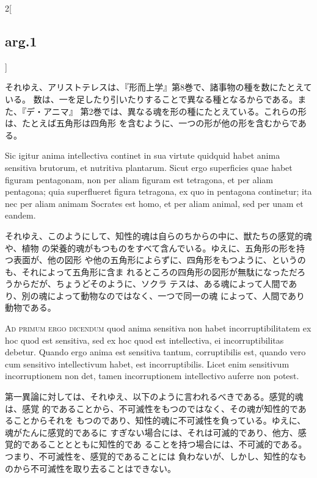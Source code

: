 \documentclass[paper=a4paper,fontsize=10pt,jafontsize=9pt,titlepage]{jlreq}
\begin{document}
\begin{paracol}{2}[\subsection{arg.1}]
\switchcolumn

それゆえ、アリストテレスは、『形而上学』第8巻で、諸事物の種を数にたとえている。
数は、一を足したり引いたりすることで異なる種となるからである。また、『デ・アニマ』
第2巻では、異なる魂を形の種にたとえている。これらの形は、たとえば五角形は四角形
を含むように、一つの形が他の形を含むからである。
 
\switchcolumn*

 Sic igitur anima intellectiva continet in sua virtute quidquid habet anima
 sensitiva brutorum, et nutritiva plantarum. Sicut ergo superficies quae habet
 figuram pentagonam, non per aliam figuram est tetragona, et per aliam
 pentagona; quia superflueret figura tetragona, ex quo in pentagona continetur;
 ita nec per aliam animam Socrates est homo, et per aliam animal, sed per unam
 et eandem.

\switchcolumn

それゆえ、このようにして、知性的魂は自らのちからの中に、獣たちの感覚的魂や、植物
の栄養的魂がもつものをすべて含んでいる。ゆえに、五角形の形を持つ表面が、他の図形
や他の五角形によらずに、四角形をもつように、というのも、それによって五角形に含ま
れるところの四角形の図形が無駄になっただろうからだが、ちょうどそのように、ソクラ
テスは、ある魂によって人間であり、別の魂によって動物なのではなく、一つで同一の魂
によって、人間であり動物である。
 
\switchcolumn*[\subsection{ad 1}]



 {\scshape Ad primum ergo dicendum} quod anima sensitiva non habet
incorruptibilitatem ex hoc quod est sensitiva, sed ex hoc quod est intellectiva,
ei incorruptibilitas debetur. Quando ergo anima est sensitiva tantum,
corruptibilis est, quando vero cum sensitivo intellectivum habet, est
incorruptibilis. Licet enim sensitivum incorruptionem non det, tamen
incorruptionem intellectivo auferre non potest.


\switchcolumn

 第一異論に対しては、それゆえ、以下のように言われるべきである。感覚的魂は、感覚
 的であることから、不可滅性をもつのではなく、その魂が知性的であることからそれを
 もつのであり、知性的魂に不可滅性を負っている。ゆえに、魂がたんに感覚的であるに
 すぎない場合には、それは可滅的であり、他方、感覚的であることとともに知性的であ
 ることを持つ場合には、不可滅的である。つまり、不可滅性を、感覚的であることには
 負わないが、しかし、知性的なものから不可滅性を取り去ることはできない。
 

\end{paracol}
\end{document}
